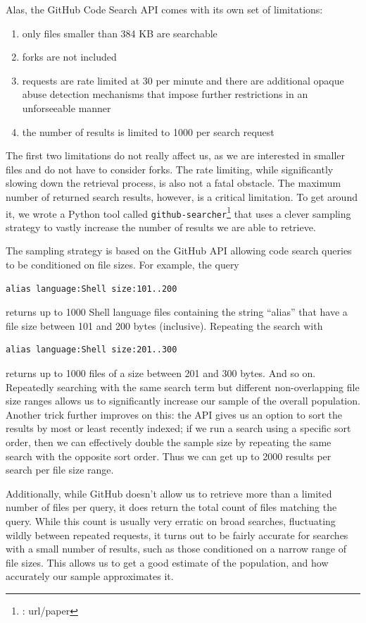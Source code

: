 Alas, the GitHub Code Search API comes with its own set of limitations:
\begin{enumerate}
    \item only files smaller than 384 KB are searchable
    \item forks are not included
    \item requests are rate limited at 30 per minute and there are additional opaque abuse detection mechanisms that impose further restrictions in an unforseeable manner
    \item the number of results is limited to 1000 per search request
\end{enumerate}
The first two limitations do not really affect us, as we are interested in smaller files and do not have to consider forks.
The rate limiting, while significantly slowing down the retrieval process, is also not a fatal obstacle.
The maximum number of returned search results, however, is a critical limitation.
To get around it, we wrote a Python tool called \verb|github-searcher|\footnote{\TODO: url/paper} that uses a clever sampling strategy to vastly increase the number of results we are able to retrieve.

The sampling strategy is based on the GitHub API allowing code search queries to be conditioned on file sizes. 
For example, the query 
\begin{verbatim}
alias language:Shell size:101..200
\end{verbatim}
returns up to 1000 Shell language files containing the string ``alias'' that have a file size between 101 and 200 bytes (inclusive).
Repeating the search with 
\begin{verbatim}
alias language:Shell size:201..300
\end{verbatim}
returns up to 1000 files of a size between 201 and 300 bytes.
And so on.
Repeatedly searching with the same search term but different non-overlapping file size ranges allows us to significantly increase our sample of the overall population.
Another trick further improves on this: 
the API gives us an option to sort the results by most or least recently indexed;
if we run a search using a specific sort order, then we can effectively double the sample size by repeating the same search with the opposite sort order.
Thus we can get up to 2000 results per search per file size range.

Additionally, while GitHub doesn't allow us to retrieve more than a limited number of files per query, it does return the total count of files matching the query.
While this count is usually very erratic on broad searches, fluctuating wildly between repeated requests, it turns out to be fairly accurate for searches with a small number of results, such as those conditioned on a narrow range of file sizes.
This allows us to get a good estimate of the population, and how accurately our sample approximates it.

